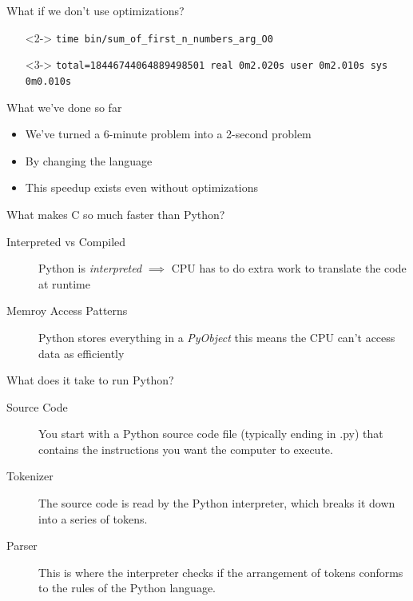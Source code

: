 \documentclass[12pt, aspectration=169]{beamer}
\begin{document}
    \begin{frame}{What if we don't use optimizations?}
        \begin{itemize}
            \item[]<2-> \texttt{time bin/sum\_of\_first\_n\_numbers\_arg\_O0\newline}
            \item[]<3-> \texttt{total=18446744064889498501\newline
            real 0m2.020s\newline
            user 0m2.010s\newline
            sys 0m0.010s\newline}
        \end{itemize}
    \end{frame}

    \begin{frame}{What we've done so far}
        \begin{itemize}
            \item We've turned a 6-minute problem into a 2-second problem
            \item By changing the language
            \item This speedup exists even without optimizations
        \end{itemize}
    \end{frame}

    \begin{frame}{What makes C so much faster than Python?}
        \begin{description}
            \item[Interpreted vs Compiled] Python is \textit{interpreted} $\implies$ CPU has to do extra work to translate the code at runtime
            \item[Memroy Access Patterns] Python stores everything in a \textit{PyObject} this means the CPU can't access data as efficiently
        \end{description}
    \end{frame}

    \begin{frame}{What does it take to run Python?}
        \begin{description}
            \item[Source Code] You start with a Python source code file (typically ending in .py) that contains the instructions you want the computer to execute.
            \item[Tokenizer] The source code is read by the Python interpreter, which breaks it down into a series of tokens.
            \item[Parser] This is where the interpreter checks if the arrangement of tokens conforms to the rules of the Python language.
        \end{description}
    \end{frame}
\end{document}

